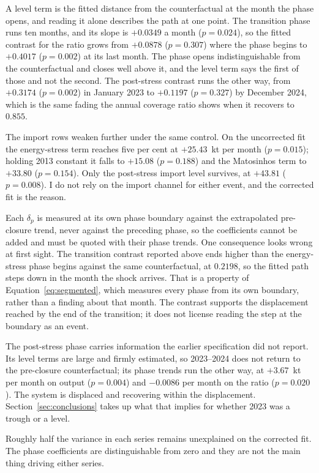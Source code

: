 \documentclass[11pt,a4paper]{article}
\begin{document}
A level term is the fitted distance from the counterfactual at the month the phase opens, and
reading it alone describes the path at one point. The transition phase runs ten months, and its
slope is $+0.0349$ a month ($p=0.024$), so the fitted contrast for the ratio grows from
$+0.0878$ ($p=0.307$) where the phase begins to $+0.4017$ ($p=0.002$) at its last month. The
phase opens indistinguishable from the counterfactual and closes well above it, and the level
term says the first of those and not the second. The post-stress contrast runs the other way,
from $+0.3174$ ($p=0.002$) in January 2023 to $+0.1197$ ($p=0.327$) by December 2024, which is
the same fading the annual coverage ratio shows when it recovers to $0.855$.

The import rows weaken further under the same control. On the uncorrected fit the energy-stress
term reaches five per cent at $+25.43$~kt per month ($p=0.015$); holding 2013 constant it falls
to $+15.08$ ($p=0.188$) and the Matosinhos term to $+33.80$ ($p=0.154$). Only the post-stress
import level survives, at $+43.81$ ($p=0.008$). I do not rely on the import channel for either
event, and the corrected fit is the reason.

Each $\delta_p$ is measured at its own phase boundary against the extrapolated pre-closure
trend, never against the preceding phase, so the coefficients cannot be added and must be quoted
with their phase trends. One consequence looks wrong at first sight. The transition
contrast reported above ends higher than the energy-stress phase begins against the same
counterfactual, at $0.2198$, so the fitted path steps down in the month the shock arrives. That
is a property of Equation~\ref{eq:segmented}, which measures every phase from its own boundary,
rather than a finding about that month. The contrast supports the displacement reached by the
end of the transition; it does not license reading the step at the boundary as an event.

The post-stress phase carries information the earlier specification did not report. Its level
terms are large and firmly estimated, so 2023--2024 does not return to the pre-closure
counterfactual; its phase trends run the other way, at $+3.67$~kt per month on output
($p=0.004$) and $-0.0086$ per month on the ratio ($p=0.020$). The system is displaced and
recovering within the displacement. Section~\ref{sec:conclusions} takes up what that implies for
whether 2023 was a trough or a level.

Roughly half the variance in each series remains unexplained on the corrected fit. The phase
coefficients are distinguishable from zero and they are not the main thing driving either
series.
\end{document}
